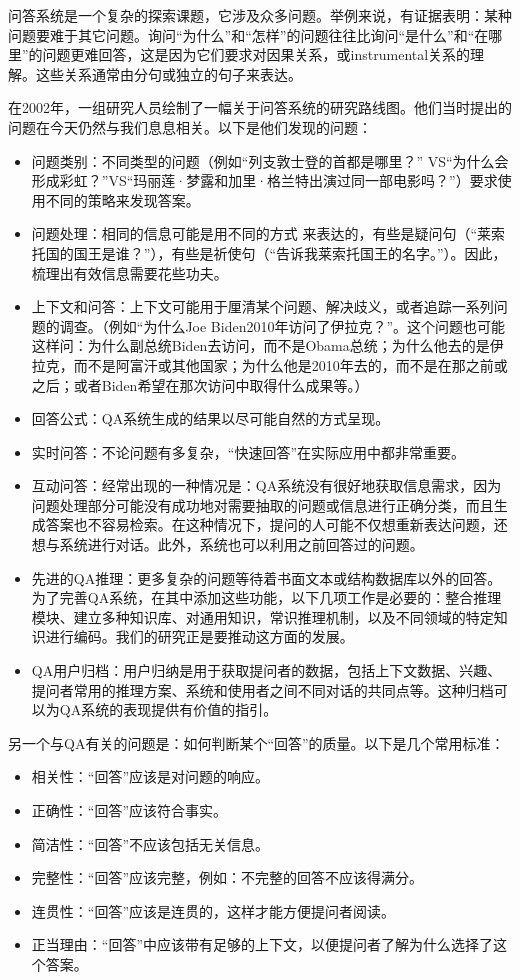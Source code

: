 问答系统是一个复杂的探索课题，它涉及众多问题。举例来说，有证据表明：某种问题要难于其它问题。询问“为什么”和“怎样”的问题往往比询问“是什么”和“在哪里”的问题更难回答，这是因为它们要求对因果关系，或instrumental关系的理解。这些关系通常由分句或独立的句子来表达\cite{Hirschman1999}。

在2002年，一组研究人员绘制了一幅关于问答系统的研究路线图\cite{Burger2002}。他们当时提出的问题在今天仍然与我们息息相关。以下是他们发现的问题：

\begin{itemize}
\item 问题类别：不同类型的问题（例如“列支敦士登的首都是哪里？” VS“为什么会形成彩虹？”VS“玛丽莲·梦露和加里·格兰特出演过同一部电影吗？”）要求使用不同的策略来发现答案。
\item 问题处理：相同的信息可能是用不同的方式 来表达的，有些是疑问句（“莱索托国的国王是谁？”），有些是祈使句（“告诉我莱索托国王的名字。”）。因此，梳理出有效信息需要花些功夫。
\item 上下文和问答：上下文可能用于厘清某个问题、解决歧义，或者追踪一系列问题的调查。（例如“为什么Joe Biden2010年访问了伊拉克？”。这个问题也可能这样问：为什么副总统Biden去访问，而不是Obama总统；为什么他去的是伊拉克，而不是阿富汗或其他国家；为什么他是2010年去的，而不是在那之前或之后；或者Biden希望在那次访问中取得什么成果等。）
\item 回答公式：QA系统生成的结果以尽可能自然的方式呈现。
\item 实时问答：不论问题有多复杂，“快速回答”在实际应用中都非常重要。
\item 互动问答：经常出现的一种情况是：QA系统没有很好地获取信息需求，因为问题处理部分可能没有成功地对需要抽取的问题或信息进行正确分类，而且生成答案也不容易检索。在这种情况下，提问的人可能不仅想重新表达问题，还想与系统进行对话。此外，系统也可以利用之前回答过的问题。
\item 先进的QA推理：更多复杂的问题等待着书面文本或结构数据库以外的回答。为了完善QA系统，在其中添加这些功能，以下几项工作是必要的：整合推理模块、建立多种知识库、对通用知识，常识推理机制，以及不同领域的特定知识进行编码。我们的研究正是要推动这方面的发展。
\item QA用户归档：用户归纳是用于获取提问者的数据，包括上下文数据、兴趣、提问者常用的推理方案、系统和使用者之间不同对话的共同点等。这种归档可以为QA系统的表现提供有价值的指引。
\end{itemize}

另一个与QA有关的问题是：如何判断某个“回答”的质量。以下是几个常用标准：

\begin{itemize}
\item 相关性：“回答”应该是对问题的响应。
\item 正确性：“回答”应该符合事实。
\item 简洁性：“回答”不应该包括无关信息。
\item 完整性：“回答”应该完整，例如：不完整的回答不应该得满分。
\item 连贯性：“回答”应该是连贯的，这样才能方便提问者阅读。
\item 正当理由：“回答”中应该带有足够的上下文，以便提问者了解为什么选择了这个答案。
\end{itemize}

